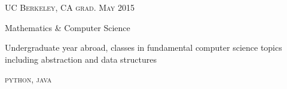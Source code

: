 {\raggedright
  \textsc{\small{UC Berkeley, CA
    \hfill
    {\raggedleft
      grad. May 2015
    }
  }}

  {\raggedright\large {
    Mathematics \& Computer Science
  } \\}

  \normalsize{
    Undergraduate year abroad, classes in fundamental computer science topics including abstraction and data structures
  }

  \textsc{\small{\color{highlight}
    python, java
  }}

  \vspace{8pt}
}
